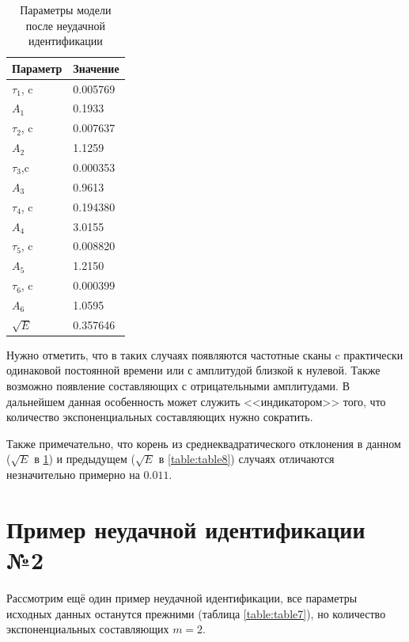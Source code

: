 \documentclass{report}
\begin{document}
        \begin{table}[ht]
            \caption{Параметры модели после неудачной идентификации}
            \label{table:table9}
            \centering
            \begin{tabular}{ | l | l | }
                \hline
                Параметр & Значение \\
                \hline
                $\tau_1$, c & 0.005769 \\
                $A_1$ & 0.1933 \\
                \hline
                $\tau_2$, c & 0.007637 \\
                $A_2$ & 1.1259 \\
                \hline
                $\tau_3$,c & 0.000353 \\
                $A_3$ & 0.9613 \\
                \hline
                $\tau_4$, c & 0.194380 \\
                $A_4$ & 3.0155 \\
                \hline
                $\tau_5$, c & 0.008820 \\
                $A_5$ & 1.2150 \\
                \hline
                $\tau_6$, c & 0.000399 \\
                $A_6$ & 1.0595 \\
                \hline
                $\sqrt{E}$ & 0.357646 \\
                \hline
            \end{tabular}
        \end{table}

        Нужно отметить, что в таких случаях появляются частотные сканы c практически 
        одинаковой постоянной времени или с амплитудой близкой к нулевой. Также 
        возможно появление составляющих с отрицательными амплитудами. В дальнейшем 
        данная особенность может служить <<индикатором>> того, что количество 
        экспоненциальных составляющих нужно сократить.

        Также примечательно, что корень из среднеквадратического отклонения в данном
        ($\sqrt{E}$ в \ref{table:table9}) и предыдущем ($\sqrt{E}$ в 
        \ref{table:table8}) случаях отличаются незначительно примерно на $0.011$.


        \section{Пример неудачной идентификации №2}
        Рассмотрим ещё один пример неудачной идентификации, все параметры исходных 
        данных останутся прежними (таблица \ref{table:table7}), но количество 
        экспоненциальных составляющих $m = 2$.
\end{document}
